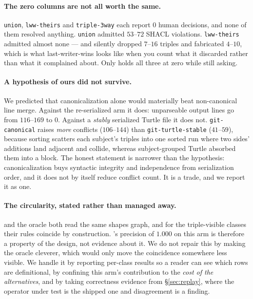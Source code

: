 \paragraph{The zero columns are not all worth the same.} \texttt{union},
\texttt{lww-theirs} and \texttt{triple-3way} each report $0$ human decisions, and
none of them resolved anything. \texttt{union} admitted $53$--$72$ SHACL
violations. \texttt{lww-theirs} admitted almost none --- and silently dropped
$7$--$16$ triples and fabricated $4$--$10$, which is what last-writer-wins looks
like when you count what it discarded rather than what it complained about. Only
\op holds all three at zero while still asking.

\paragraph{A hypothesis of ours did not survive.} We predicted that
canonicalization alone would materially beat non-canonical line merge. Against
the re-serialized arm it does: unparseable output lines go from $116$--$169$ to
$0$. Against a \emph{stably} serialized Turtle file it does not.
\texttt{git-canonical} raises \emph{more} conflicts ($106$--$144$) than
\texttt{git-turtle-stable} ($41$--$59$), because sorting scatters each subject's
triples into one sorted run where two sides' additions land adjacent and collide,
whereas subject-grouped Turtle absorbed them into a block. The honest statement
is narrower than the hypothesis: canonicalization buys syntactic integrity and
independence from serialization order, and it does not by itself reduce conflict
count. It is a trade, and we report it as one.

\paragraph{The circularity, stated rather than managed away.} \op and the oracle
both read the same shapes graph, and for the triple-visible classes their rules
coincide by construction. \op's precision of $1.000$ on this arm is therefore a
property of the design, not evidence about it. We do not repair this by making
the oracle cleverer, which would only move the coincidence somewhere less
visible. We handle it by reporting per-class results so a reader can see which
rows are definitional, by confining this arm's contribution to the \emph{cost of
the alternatives}, and by taking correctness evidence from \S\ref{sec:replay},
where the operator under test is the shipped one and disagreement is a finding.
